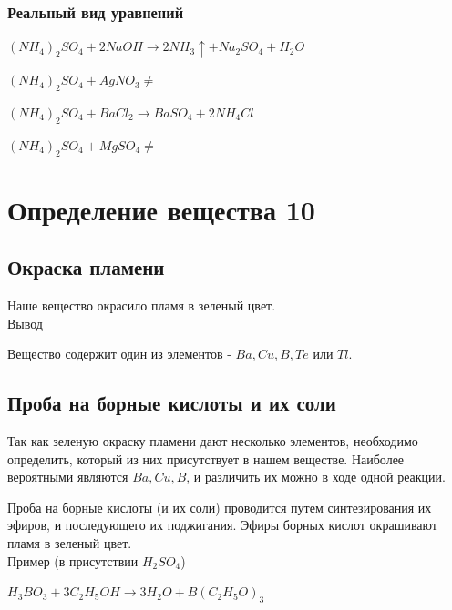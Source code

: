\documentclass[a4paper,14pt,notitlepage,twoside]{article}
\begin{document}
            \subsubsection{Реальный вид уравнений}
                $(NH_4)_2SO_4+2NaOH \to 2NH_3\uparrow + Na_2SO_4 + H_2O$
                \par$(NH_4)_2SO_4+AgNO_3 \ne$
                \par$(NH_4)_2SO_4+BaCl_2\to BaSO_4 + 2NH_4Cl$
                \par$(NH_4)_2SO_4+MgSO_4\ne$
            

    \newpage
    \section{Определение вещества 10}
        
        \subsection{Окраска пламени} 
            Наше вещество окрасило пламя в зеленый цвет.\\

            Вывод

            Вещество содержит один из элементов - $Ba, Cu, B, Te$ или $Tl$.

        \subsection{Проба на борные кислоты и их соли}
            Так как зеленую окраску пламени дают несколько элементов, необходимо определить,
            который из них присутствует в нашем веществе. Наиболее вероятными являются
            $Ba, Cu, B$, и различить их можно в ходе одной реакции.\newline

            Проба на борные кислоты (и их соли) проводится путем синтезирования их эфиров,
            и последующего их поджигания. Эфиры борных кислот окрашивают 
            пламя в зеленый цвет.\\

            Пример (в присутствии $H_2SO_4$)
            
            \par $H_3BO_3  + 3C_2H_5OH \to 3H_2O + B(C_2H_5O)_3$\\
            
\end{document}

